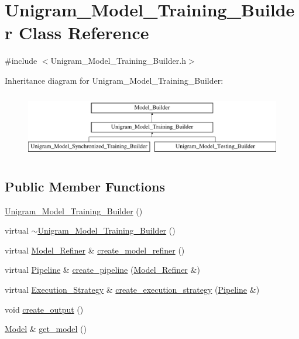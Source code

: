 \hypertarget{class_unigram___model___training___builder}{
\section{Unigram\_\-Model\_\-Training\_\-Builder Class Reference}
\label{class_unigram___model___training___builder}
}


{\ttfamily \#include $<$Unigram\_\-Model\_\-Training\_\-Builder.h$>$}

Inheritance diagram for Unigram\_\-Model\_\-Training\_\-Builder:\begin{figure}[H]
\begin{center}
\leavevmode
\includegraphics[height=2.86689cm]{class_unigram___model___training___builder}
\end{center}
\end{figure}
\subsection*{Public Member Functions}
\begin{DoxyCompactItemize}
\item 
\hyperlink{class_unigram___model___training___builder_aa050ceecba581ea76465d6e534b6e014}{Unigram\_\-Model\_\-Training\_\-Builder} ()
\item 
virtual \hyperlink{class_unigram___model___training___builder_ad256c5144db8fb63caa70f3ea8e77129}{$\sim$Unigram\_\-Model\_\-Training\_\-Builder} ()
\item 
virtual \hyperlink{class_model___refiner}{Model\_\-Refiner} \& \hyperlink{class_unigram___model___training___builder_a6693c87834917804525d1d8f4d638507}{create\_\-model\_\-refiner} ()
\item 
virtual \hyperlink{class_pipeline}{Pipeline} \& \hyperlink{class_unigram___model___training___builder_a9f52dba1344442bc6455cf8b166f398c}{create\_\-pipeline} (\hyperlink{class_model___refiner}{Model\_\-Refiner} \&)
\item 
virtual \hyperlink{class_execution___strategy}{Execution\_\-Strategy} \& \hyperlink{class_unigram___model___training___builder_a7115521792cd0262b3bf99de8474420d}{create\_\-execution\_\-strategy} (\hyperlink{class_pipeline}{Pipeline} \&)
\item 
void \hyperlink{class_unigram___model___training___builder_a5377e0fdb76e0068a02cbc0ce5c385fb}{create\_\-output} ()
\item 
\hyperlink{class_model}{Model} \& \hyperlink{class_unigram___model___training___builder_a06bbd9a4b897a0357078f3279825409d}{get\_\-model} ()
\end{DoxyCompactItemize}
